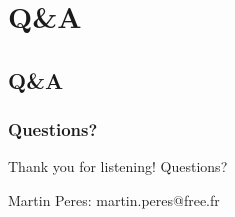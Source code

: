 \documentclass[11pt,english,compress]{beamer}
\begin{document}
\section{Q\&A}
\subsection*{Q\&A}
\begin{frame}
	\frametitle{Questions?}
	\begin{block}{}
		\begin{center}
			\bigskip
			\huge Thank you for listening! Questions?
			\bigskip
		\end{center}
	\end{block}
	\vspace{20pt}
	\begin{block}{}
		\begin{center}
			\bigskip
			\large Martin Peres: martin.peres@free.fr
			\bigskip
		\end{center}
	\end{block}
\end{frame}

\end{document}
